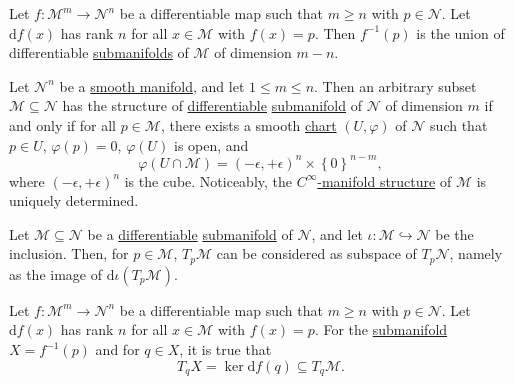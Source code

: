 \begin{lemma}
	Let \(f\colon \mathcal{M}^m \to  \mathcal{N}^n \) be a differentiable map such that \(m \geq n\) with \(p\in \mathcal{N} \). Let \(\mathrm{d} f(x)\) has rank \(n\) for all \(x\in \mathcal{M} \) with \(f(x) = p\). Then \(f^{-1} (p)\) is the union of differentiable \hyperref[def:submanifold]{submanifolds} of \(\mathcal{M} \) of dimension \(m - n\).
\end{lemma}

\begin{remark}
	Let \(\mathcal{N}^n \) be a \hyperref[def:smooth-manifold]{smooth manifold}, and let \(1 \leq m \leq n\). Then an arbitrary subset \(\mathcal{M} \subseteq \mathcal{N} \) has the structure of \hyperref[def:smooth-manifold]{differentiable} \hyperref[def:submanifold]{submanifold} of \(\mathcal{N} \) of dimension \(m\) if and only if for all \(p\in \mathcal{M}\), there exists a smooth \hyperref[def:coordinate-chart]{chart} \((U, \varphi )\) of \(\mathcal{N} \) such that \(p\in U\), \(\varphi (p) = 0\), \(\varphi (U)\) is open, and
	\[
		\varphi (U \cap \mathcal{M} ) = (-\epsilon , +\epsilon )^n \times \left\{0\right\} ^{n - m},
	\]
	where \((-\epsilon , +\epsilon )^n\) is the cube. Noticeably, the \hyperref[def:smooth-structure]{\(C^{\infty} \)-manifold structure} of \(\mathcal{M} \) is uniquely determined.
\end{remark}

\begin{remark}
	Let \(\mathcal{M} \subseteq \mathcal{N} \) be a \hyperref[def:smooth-manifold]{differentiable} \hyperref[def:submanifold]{submanifold} of \(\mathcal{N} \), and let \(\iota \colon \mathcal{M} \hookrightarrow \mathcal{N} \) be the inclusion. Then, for \(p\in \mathcal{M} \), \(T_p \mathcal{M} \) can be considered as subspace of \(T_p \mathcal{N} \), namely as the image of \(\mathrm{d} \iota (T_p \mathcal{M} )\).
\end{remark}

\begin{lemma}
	Let \(f\colon \mathcal{M}^m \to  \mathcal{N}^n \) be a differentiable map such that \(m \geq n\) with \(p\in \mathcal{N} \). Let \(\mathrm{d} f(x)\) has rank \(n\) for all \(x\in \mathcal{M} \) with \(f(x) = p\). For the \hyperref[def:submanifold]{submanifold} \(X = f^{-1} (p)\) and for \(q\in X\), it is true that
	\[
		T_q X = \ker \mathrm{d} f(q) \subseteq T_q \mathcal{M} .
	\]
\end{lemma}